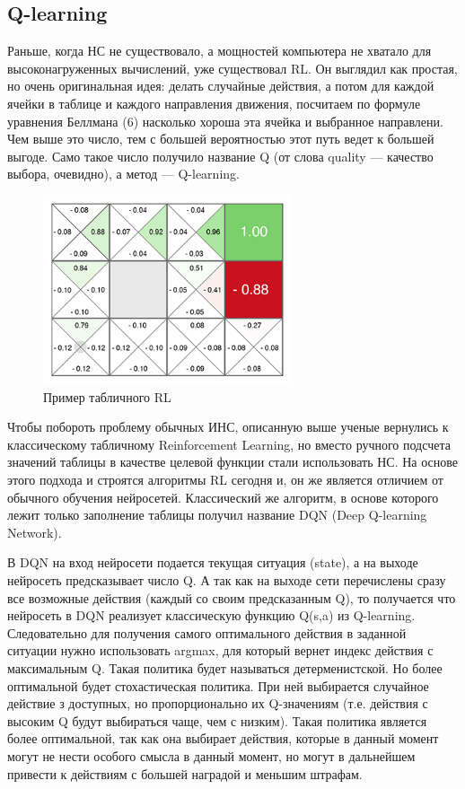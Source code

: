 \documentclass[bachelor, och, coursework]{shiza}
\begin{document}
\subsection{Q-learning}
Раньше, когда НС не существовало, а мощностей компьютера не хватало для высоконагруженных вычислений, уже существовал RL. Он выглядил как простая, но очень оригинальная идея:
делать случайные действия, а потом для каждой ячейки в таблице и каждого направления движения, посчитаем по формуле уравнения Беллмана (6) насколько хороша эта ячейка и выбранное направлени. Чем
выше это число, тем с большей вероятностью этот путь ведет к большей выгоде. Само такое число получило название Q (от слова quality — качество выбора, очевидно), а метод —
Q-learning.
\begin{figure}[H]
    \centering
    \includegraphics[width=0.65\textwidth]{pic/8}
    \caption{Пример табличного RL}
    \label{fig:img1}
\end{figure}
Чтобы побороть проблему обычных ИНС, описанную выше ученые вернулись к классическому табличному Reinforcement Learning, но вместо ручного подсчета значений таблицы в качестве
целевой функции стали использовать НС. На основе этого подхода и строятся алгоритмы RL сегодня и, он же является отличием от обычного обучения нейросетей. Классический же
алгоритм, в основе которого лежит только заполнение таблицы получил название DQN (Deep Q-learning Network).

В DQN на вход нейросети подается текущая ситуация (state), а на выходе нейросеть предсказывает число Q. А так как на выходе сети перечислены сразу все возможные действия
(каждый со своим предсказанным Q), то получается что нейросеть в DQN реализует классическую функцию Q(s,a) из Q-learning. Следовательно для получения самого оптимального
действия в заданной ситуации нужно использовать argmax, для который вернет индекс действия с максимальным Q. Такая политика будет называться детерменистской. Но более
оптимальной будет стохастическая политика. При ней выбирается случайное действие з доступных, но пропорционально их Q-значениям (т.е. действия с высоким Q будут выбираться
чаще, чем с низким). Такая политика является более оптимальной, так как она выбирает действия, которые в данный момент могут не нести особого смысла в данный момент, но могут
в дальнейшем привести к действиям с большей наградой и меньшим штрафам.
\end{document}
